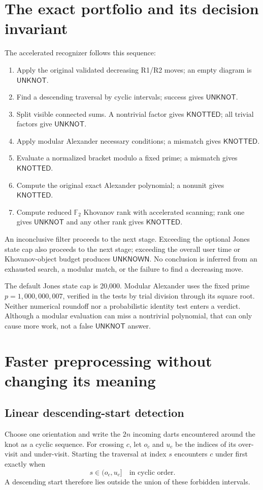 \documentclass[11pt]{article}
\theoremstyle{definition}\newtheorem{definition}[theorem]{Definition}
\theoremstyle{remark}\newtheorem{remark}[theorem]{Remark}
\newcommand{\F}{\mathbb F_2}
\newcommand{\unk}{\textsf{UNKNOT}}
\newcommand{\knot}{\textsf{KNOTTED}}
\newcommand{\unknown}{\textsf{UNKNOWN}}
\begin{document}
\section{The exact portfolio and its decision invariant}\label{sec:portfolio}
The accelerated recognizer follows this sequence:
\begin{center}
\begin{minipage}{0.94\linewidth}
\begin{enumerate}[itemsep=2pt,topsep=3pt]
\item Apply the original validated decreasing R1/R2 moves; an empty diagram is $\unk$.
\item Find a descending traversal by cyclic intervals; success gives $\unk$.
\item Split visible connected sums. A nontrivial factor gives $\knot$;
      all trivial factors give $\unk$.
\item Apply modular Alexander necessary conditions; a mismatch gives $\knot$.
\item Evaluate a normalized bracket modulo a fixed prime; a mismatch gives $\knot$.
\item Compute the original exact Alexander polynomial; a nonunit gives $\knot$.
\item Compute reduced $\F$ Khovanov rank with accelerated scanning; rank one
      gives $\unk$ and any other rank gives $\knot$.
\end{enumerate}
\end{minipage}
\end{center}
An inconclusive filter proceeds to the next stage. Exceeding the optional Jones
state cap also proceeds to the next stage; exceeding the overall user time or
Khovanov-object budget produces $\unknown$. No conclusion is inferred from an
exhausted search, a modular match, or the failure to find a decreasing move.

The default Jones state cap is 20,000. Modular Alexander uses the fixed prime
$p=1{,}000{,}000{,}007$, verified in the tests by trial division through its
square root. Neither numerical roundoff nor a probabilistic identity test enters
a verdict. Although a modular evaluation can miss a nontrivial polynomial,
that can only cause more work, not a false $\unk$ answer.

\section{Faster preprocessing without changing its meaning}
\subsection{Linear descending-start detection}
Choose one orientation and write the $2n$ incoming darts encountered around the
knot as a cyclic sequence. For crossing $c$, let $o_c$ and $u_c$ be the indices
of its over-visit and under-visit. Starting the traversal at index $s$ encounters
$c$ under first exactly when
\begin{equation}\label{eq:badinterval}
 s\in(o_c,u_c]\quad\text{in cyclic order}.
\end{equation}
A descending start therefore lies outside the union of these forbidden
intervals.
\end{document}
